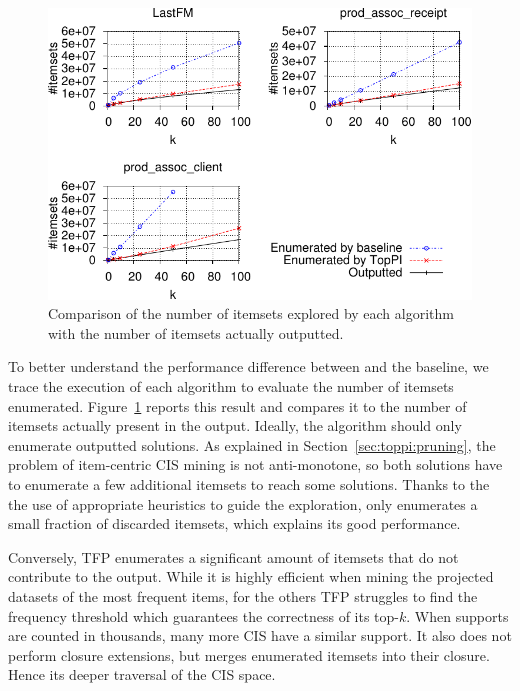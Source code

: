 \begin{figure}
	\centering
	\includegraphics{fig/toppi/exploredVSoutputted/nbTraversed-perK-all.pdf}
	\caption{\label{fig:usefulVSexplored} Comparison of the number of itemsets
		explored by each algorithm with the number of itemsets actually outputted.
	}
\end{figure}

\begin{paragraph}{}
	To better understand the performance difference between \toppi and the baseline,
	we trace the execution of each algorithm to evaluate the number of itemsets enumerated.
	Figure~\ref{fig:usefulVSexplored} reports this result
	and compares it to the number of itemsets actually present in the output.
	Ideally, the algorithm should only enumerate outputted solutions.
	As explained in Section~\ref{sec:toppi:pruning},
	the problem of item-centric CIS mining is not anti-monotone,
	so both solutions have to enumerate a few additional itemsets to reach some solutions.
	Thanks to the the use of appropriate heuristics to guide the exploration,
	\toppi only enumerates a small fraction of discarded itemsets, which explains its good performance.
\end{paragraph}

Conversely, TFP enumerates a significant amount of itemsets that do not contribute to the output.
While it is highly efficient when mining the projected datasets of the most frequent items,
for the others TFP struggles to find the frequency threshold which guarantees
the correctness of its top-$k$.
When supports are counted in thousands, many more CIS have a similar support.
It also does not perform closure extensions,
but merges enumerated itemsets into their closure.
Hence its deeper traversal of the CIS space.

